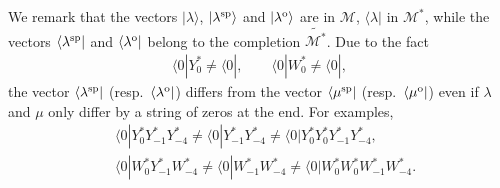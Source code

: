 \documentclass[10pt,a4paper]{amsart}
\numberwithin{equation}{section}
\begin{document}
We remark that the vectors $|\lambda\rangle$, $|\lambda^{\rm sp}\rangle$ and $|\lambda^{\rm o}\rangle$ are in $\mathcal{M}$, $\langle \lambda|$ in $\mathcal{M}^*$, while the vectors $\langle \lambda^{\rm sp}|$ and $\langle \lambda^{\rm o}|$ belong to the completion $\widetilde{\mathcal{M}^*}$. Due to the fact
\begin{align*}
\langle 0|Y^*_0\neq \langle 0|,\qquad \langle 0|W^*_0\neq \langle 0|,
\end{align*}
the vector $\langle \lambda^{\rm sp}|$ (resp.\ $\langle \lambda^{\rm o}|$) differs from the vector $\langle \mu^{\rm sp}|$ (resp.\ $\langle \mu^{\rm o}|$) even if $\lambda$ and $\mu$ only differ by a string of zeros at the end.
For examples,
\begin{align*}
&\langle 0|Y^*_{0}Y^*_{-1}Y^*_{-4}\neq\langle 0|Y^*_{-1}Y^*_{-4}\neq\langle 0|Y^*_{0}Y^*_{0}Y^*_{-1}Y^*_{-4},\\
&\langle 0|W^*_{0}Y^*_{-1}W^*_{-4}\neq\langle 0|W^*_{-1}W^*_{-4}\neq\langle 0|W^*_{0}W^*_{0}W^*_{-1}W^*_{-4}.
\end{align*}
\end{document}
